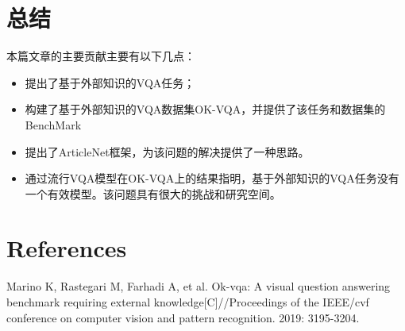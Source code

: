 \documentclass[conference,10pt]{IEEEtran}
\begin{document}
\section{总结}
本篇文章的主要贡献主要有以下几点：
\begin{itemize}
	\item 提出了基于外部知识的VQA任务；
	\item 构建了基于外部知识的VQA数据集OK-VQA，并提供了该任务和数据集的BenchMark
	\item 提出了ArticleNet框架，为该问题的解决提供了一种思路。
	\item 通过流行VQA模型在OK-VQA上的结果指明，基于外部知识的VQA任务没有一个有效模型。该问题具有很大的挑战和研究空间。
\end{itemize}
\section*{References}
\begin{thebibliography}{00}
 Marino K, Rastegari M, Farhadi A, et al. Ok-vqa: A visual question answering benchmark requiring external knowledge[C]//Proceedings of the IEEE/cvf conference on computer vision and pattern recognition. 2019: 3195-3204.
\end{thebibliography}
\end{document}
